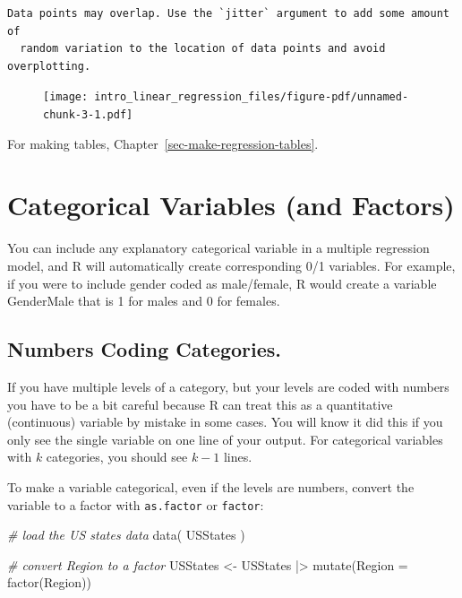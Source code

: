 \documentclass[
  letterpaper,
  DIV=11,
  numbers=noendperiod]{scrreprt}
\newenvironment{Shaded}{\begin{snugshade}}{\end{snugshade}}
\newcommand{\AttributeTok}[1]{\textcolor[rgb]{0.49,0.56,0.16}{#1}}
\newcommand{\CommentTok}[1]{\textcolor[rgb]{0.38,0.63,0.69}{\textit{#1}}}
\newcommand{\FunctionTok}[1]{\textcolor[rgb]{0.02,0.16,0.49}{#1}}
\newcommand{\NormalTok}[1]{\textcolor[rgb]{0.00,0.44,0.13}{#1}}
\newcommand{\OtherTok}[1]{\textcolor[rgb]{0.00,0.44,0.13}{#1}}
\newcommand{\SpecialCharTok}[1]{\textcolor[rgb]{0.25,0.44,0.63}{#1}}
\begin{document}
\begin{verbatim}
Data points may overlap. Use the `jitter` argument to add some amount of
  random variation to the location of data points and avoid overplotting.
\end{verbatim}

\begin{figure}[H]

{\centering \texttt{[image: intro\_linear\_regression\_files/figure-pdf/unnamed-chunk-3-1.pdf]}

}

\end{figure}

For making tables, Chapter~\ref{sec-make-regression-tables}.

\hypertarget{categorical-variables-and-factors}{%
\section{Categorical Variables (and
Factors)}\label{categorical-variables-and-factors}}

You can include any explanatory categorical variable in a multiple
regression model, and R will automatically create corresponding 0/1
variables. For example, if you were to include gender coded as
male/female, R would create a variable GenderMale that is 1 for males
and 0 for females.

\hypertarget{numbers-coding-categories.}{%
\subsection{Numbers Coding
Categories.}\label{numbers-coding-categories.}}

If you have multiple levels of a category, but your levels are coded
with numbers you have to be a bit careful because R can treat this as a
quantitative (continuous) variable by mistake in some cases. You will
know it did this if you only see the single variable on one line of your
output. For categorical variables with \(k\) categories, you should see
\(k-1\) lines.

To make a variable categorical, even if the levels are numbers, convert
the variable to a factor with \texttt{as.factor} or \texttt{factor}:

\begin{Shaded}
\begin{Highlighting}[]
\CommentTok{\# load the US states data}
\FunctionTok{data}\NormalTok{( USStates )}

\CommentTok{\# convert Region to a factor}
\NormalTok{USStates }\OtherTok{\textless{}{-}}\NormalTok{ USStates }\SpecialCharTok{|\textgreater{}} 
  \FunctionTok{mutate}\NormalTok{(}\AttributeTok{Region =} \FunctionTok{factor}\NormalTok{(Region))}
\end{Highlighting}
\end{Shaded}
\end{document}
